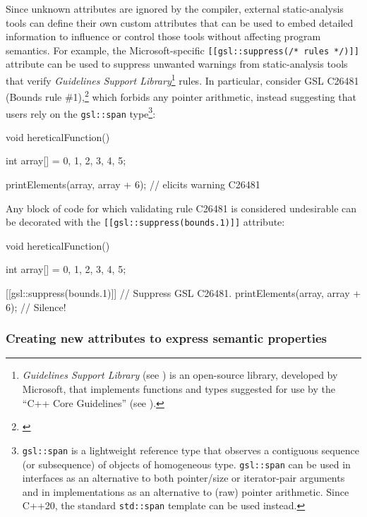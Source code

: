 Since unknown attributes are ignored by the compiler, external
static-analysis tools can define their own custom attributes that can be
used to embed detailed information to influence or control those tools
without affecting program semantics. For example, the Microsoft-specific
\lstinline![[gsl::suppress(/*!~\lstinline!rules!~\lstinline!*/)]]! attribute can
be used to suppress unwanted warnings from static-analysis tools that
verify \emph{Guidelines Support Library}{\cprotect\footnote{\emph{Guidelines
Support Library} (see \cite{microsoft}) is an open-source library, developed by Microsoft,
that implements functions and types suggested for use by the ``C++
  Core Guidelines'' (see \cite{stroustrup20}).}}
rules. In particular, consider GSL C26481 (Bounds rule \#1),\footnote{\cite{microsoftC26481}} which forbids any pointer arithmetic, instead
suggesting that users rely on the \lstinline!gsl::span!
type{\cprotect\footnote{\lstinline!gsl::span! is a lightweight reference
type that observes a contiguous sequence (or subsequence) of objects
of homogeneous type. \lstinline!gsl::span! can be used in interfaces as
an alternative to both pointer/size or iterator-pair arguments and in
implementations as an alternative to (raw) pointer arithmetic. Since
  C++20, the standard \lstinline!std::span! template can be used instead.}}:

\begin{emcppslisting}[language=C++]
void hereticalFunction()
{
    int array[] = {0, 1, 2, 3, 4, 5};

    printElements(array, array + 6);  // elicits warning C26481
}
\end{emcppslisting}

\noindent Any block of code for which validating rule C26481 is considered
undesirable can be decorated with the
\lstinline![[gsl::suppress(bounds.1)]]! attribute:

\begin{emcppslisting}[language=C++]
void hereticalFunction()
{
    int array[] = {0, 1, 2, 3, 4, 5};

    [[gsl::suppress(bounds.1)]]           // Suppress GSL C26481.
    {
        printElements(array, array + 6);  // Silence!
    }
}
\end{emcppslisting}


\subsubsection[Creating new attributes to express semantic properties]{Creating new attributes to express semantic properties}\label{creating-new-attributes-to-express-semantic-properties}


